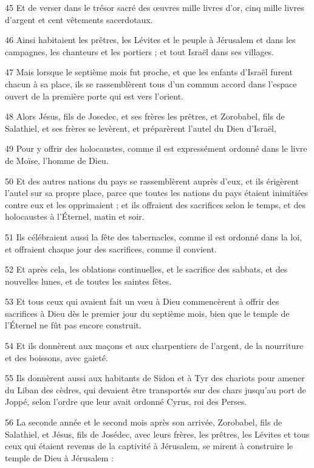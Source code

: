 \par 45 Et de verser dans le trésor sacré des œuvres mille livres d'or, cinq mille livres d'argent et cent vêtements sacerdotaux.
\par 46 Ainsi habitaient les prêtres, les Lévites et le peuple à Jérusalem et dans les campagnes, les chanteurs et les portiers ; et tout Israël dans ses villages.
\par 47 Mais lorsque le septième mois fut proche, et que les enfants d'Israël furent chacun à sa place, ils se rassemblèrent tous d'un commun accord dans l'espace ouvert de la première porte qui est vers l'orient.
\par 48 Alors Jésus, fils de Josedec, et ses frères les prêtres, et Zorobabel, fils de Salathiel, et ses frères se levèrent, et préparèrent l'autel du Dieu d'Israël,
\par 49 Pour y offrir des holocaustes, comme il est expressément ordonné dans le livre de Moïse, l'homme de Dieu.
\par 50 Et des autres nations du pays se rassemblèrent auprès d'eux, et ils érigèrent l'autel sur sa propre place, parce que toutes les nations du pays étaient inimitiées contre eux et les opprimaient ; et ils offraient des sacrifices selon le temps, et des holocaustes à l'Éternel, matin et soir.
\par 51 Ils célébraient aussi la fête des tabernacles, comme il est ordonné dans la loi, et offraient chaque jour des sacrifices, comme il convient.
\par 52 Et après cela, les oblations continuelles, et le sacrifice des sabbats, et des nouvelles lunes, et de toutes les saintes fêtes.
\par 53 Et tous ceux qui avaient fait un vœu à Dieu commencèrent à offrir des sacrifices à Dieu dès le premier jour du septième mois, bien que le temple de l'Éternel ne fût pas encore construit.
\par 54 Et ils donnèrent aux maçons et aux charpentiers de l'argent, de la nourriture et des boissons, avec gaieté.
\par 55 Ils donnèrent aussi aux habitants de Sidon et à Tyr des chariots pour amener du Liban des cèdres, qui devaient être transportés sur des chars jusqu'au port de Joppé, selon l'ordre que leur avait ordonné Cyrus, roi des Perses.
\par 56 La seconde année et le second mois après son arrivée, Zorobabel, fils de Salathiel, et Jésus, fils de Josédec, avec leurs frères, les prêtres, les Lévites et tous ceux qui étaient revenus de la captivité à Jérusalem, se mirent à construire le temple de Dieu à Jérusalem :
